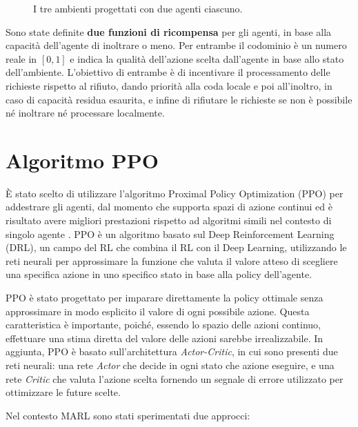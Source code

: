 \documentclass[a4paper, twocolumn]{article}
\begin{document}
\begin{figure}
    \caption{I tre ambienti progettati con due agenti ciascuno.}
    \label{fig:environments}
\end{figure}

Sono state definite \textbf{due funzioni di ricompensa} per gli agenti, in base alla capacità dell'agente di inoltrare o meno. Per entrambe il codominio è un numero reale in $[0, 1]$ e indica la qualità dell'azione scelta dall'agente in base allo stato dell'ambiente. L'obiettivo di entrambe è di incentivare il processamento delle richieste rispetto al rifiuto, dando priorità alla coda locale e poi all'inoltro, in caso di capacità residua esaurita, e infine di rifiutare le richieste se non è possibile né inoltrare né processare localmente.

\section{Algoritmo PPO}

È stato scelto di utilizzare l'algoritmo Proximal Policy Optimization (PPO) \cite{Schulman2017} per addestrare gli agenti, dal momento che supporta spazi di azione continui ed è risultato avere migliori prestazioni rispetto ad algoritmi simili nel contesto di singolo agente \cite{Petriglia2024}. PPO è un algoritmo basato sul Deep Reinforcement Learning (DRL), un campo del RL che combina il RL con il Deep Learning, utilizzando le reti neurali per approssimare la funzione che valuta il valore atteso di scegliere una specifica azione in uno specifico stato in base alla policy dell'agente.


PPO è stato progettato per imparare direttamente la policy ottimale senza approssimare in modo esplicito il valore di ogni possibile azione. Questa caratteristica è importante, poiché, essendo lo spazio delle azioni continuo, effettuare una stima diretta del valore delle azioni sarebbe irrealizzabile. In aggiunta, PPO è basato sull'architettura \textit{Actor-Critic}, in cui sono presenti due reti neurali: una rete \textit{Actor} che decide in ogni stato che azione eseguire, e una rete \textit{Critic} che valuta l'azione scelta fornendo un segnale di errore utilizzato per ottimizzare le future scelte.

Nel contesto MARL sono stati sperimentati due approcci:
\end{document}
